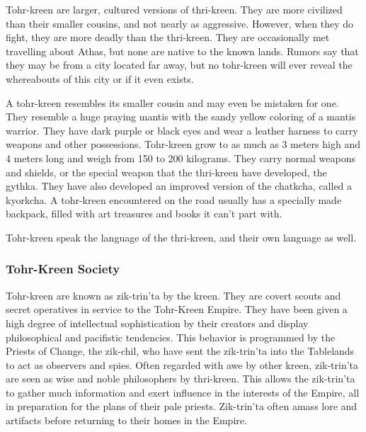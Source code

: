 Tohr-kreen are larger, cultured versions of thri-kreen. They are more civilized than their smaller cousins, and not nearly as aggressive. However, when they do fight, they are more deadly than the thri-kreen. They are occasionally met travelling about Athas, but none are native to the known lands. Rumors say that they may be from a city located far away, but no tohr-kreen will ever reveal the whereabouts of this city or if it even exists.

A tohr-kreen resembles its smaller cousin and may even be mistaken for one. They resemble a huge praying mantis with the sandy yellow coloring of a mantis warrior. They have dark purple or black eyes and wear a leather harness to carry weapons and other possessions. Tohr-kreen grow to as much as 3 meters high and 4 meters long and weigh from 150 to 200 kilograms. They carry normal weapons and shields, or the special weapon that the thri-kreen have developed, the gythka. They have also developed an improved version of the chatkcha, called a kyorkcha. A tohr-kreen encountered on the road usually has a specially made backpack, filled with art treasures and books it can't part with.

Tohr-kreen speak the language of the thri-kreen, and their own language as well.

%
%

\subsubsection{Tohr-Kreen Society}
Tohr-kreen are known as zik-trin'ta by the kreen. They are covert scouts and secret operatives in service to the Tohr-Kreen Empire. They have been given a high degree of intellectual sophistication by their creators and display philosophical and pacifistic tendencies. This behavior is programmed by the Priests of Change, the zik-chil, who have sent the zik-trin'ta into the Tablelands to act as observers and spies. Often regarded with awe by other kreen, zik-trin'ta are seen as wise and noble philosophers by thri-kreen. This allows the zik-trin'ta to gather much information and exert influence in the interests of the Empire, all in preparation for the plans of their pale priests. Zik-trin'ta often amass lore and artifacts before returning to their homes in the Empire.

